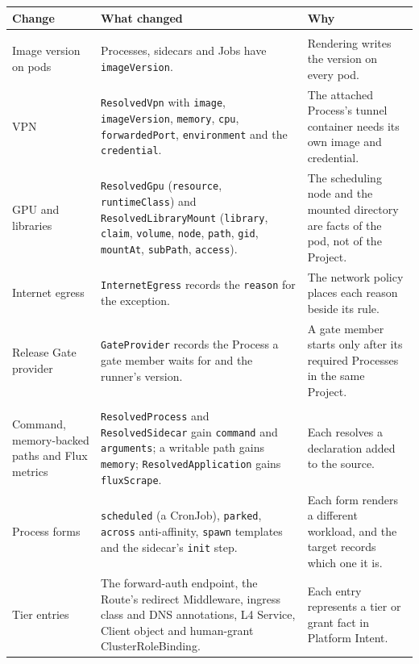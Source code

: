 \begin{table}[!htbp]
\centering
\footnotesize
\begin{tabular}{>{\raggedright\arraybackslash}p{}>{\raggedright\arraybackslash}p{}>{\raggedright\arraybackslash}p{}}
\hline
\textbf{Change} & \textbf{What changed} & \textbf{Why} \\
\hline
\multicolumn{3}{l}{\textit{Workload features}} \\
Image version on pods & Processes, sidecars and Jobs have \texttt{imageVersion}. & Rendering writes the version on every pod. \\
VPN & \texttt{ResolvedVpn} with \texttt{image}, \texttt{imageVersion}, \texttt{memory}, \texttt{cpu}, \texttt{forwardedPort}, \texttt{environment} and the \texttt{credential}. & The attached Process's tunnel container needs its own image and credential. \\
GPU and libraries & \texttt{ResolvedGpu} (\texttt{resource}, \texttt{runtimeClass}) and \texttt{ResolvedLibraryMount} (\texttt{library}, \texttt{claim}, \texttt{volume}, \texttt{node}, \texttt{path}, \texttt{gid}, \texttt{mountAt}, \texttt{subPath}, \texttt{access}). & The scheduling node and the mounted directory are facts of the pod, not of the Project. \\
Internet egress & \texttt{InternetEgress} records the \texttt{reason} for the exception. & The network policy places each reason beside its rule. \\
Release Gate provider & \texttt{GateProvider} records the Process a gate member waits for and the runner's version. & A gate member starts only after its required Processes in the same Project. \\
\multicolumn{3}{l}{\textit{Process forms and tiers}} \\
Command, memory-backed paths and Flux metrics & \texttt{ResolvedProcess} and \texttt{ResolvedSidecar} gain \texttt{command} and \texttt{arguments}; a writable path gains \texttt{memory}; \texttt{ResolvedApplication} gains \texttt{fluxScrape}. & Each resolves a declaration added to the source. \\
Process forms & \texttt{scheduled} (a CronJob), \texttt{parked}, \texttt{across} anti-affinity, \texttt{spawn} templates and the sidecar's \texttt{init} step. & Each form renders a different workload, and the target records which one it is. \\
Tier entries & The forward-auth endpoint, the Route's redirect Middleware, ingress class and DNS annotations, L4 Service, Client object and human-grant ClusterRoleBinding. & Each entry represents a tier or grant fact in Platform Intent. \\

\end{tabular}
\end{table}
